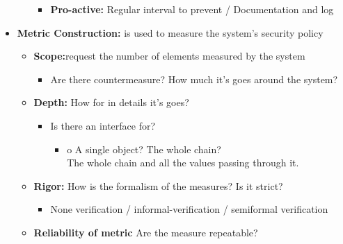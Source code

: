 \documentclass[12pt]{report}
\begin{document}
\begin{itemize}
\begin{itemize}
\begin{itemize}
	\item \textbf{Pro-active:}  Regular interval to prevent / Documentation and log\par


\end{itemize}
\end{itemize}
\newpage
	\item \textbf{Metric Construction:  } is used to measure the system's security policy \par

\begin{itemize}
	\item \textbf{Scope:}request the number of elements measured by the system \par

\begin{itemize}
	\item Are there countermeasure? How much it’s goes around the system?  \par

\end{itemize}

	\item \textbf{Depth: } How for in details it’s goes?  \par

\begin{itemize}
	\item Is there an interface for?  \par

\begin{itemize}
	\item o	A single object? The whole chain?   \\
The whole chain and all the values passing through it.\par


\end{itemize}
\end{itemize}
	\item \textbf{Rigor:  }How is the formalism of the measures? Is it strict?  \par

\begin{itemize}
	\item None verification / informal-verification / semiformal verification    \par


\end{itemize}
	\item \textbf{ Reliability of metric }Are the measure repeatable?  \par


\end{itemize}
\end{itemize}
\end{document}
